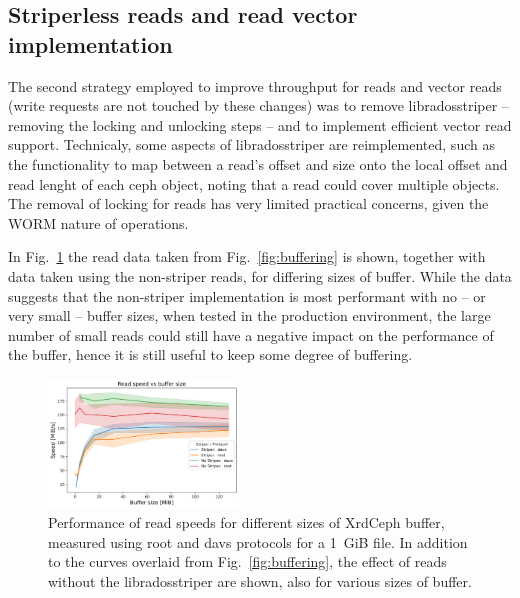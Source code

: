 \documentclass{webofc}
\begin{document}
\subsection{Striperless reads and read vector implementation\label{sec:striperless}}
The second strategy employed to improve throughput for reads and vector reads (write requests are not touched by these changes) was to remove libradosstriper -- removing the locking and unlocking steps -- and to implement efficient vector read support. 
Technicaly, some aspects of libradosstriper are reimplemented, such as the functionality to map between a read's offset and size onto the local offset and read lenght of each ceph object, noting that a read could cover multiple objects. The removal of locking for reads has very limited practical concerns, given the WORM nature of operations.

In Fig.~\ref{fig:bufferingnostriper} the read data taken from Fig.~\ref{fig:buffering} is shown, together with data taken using the non-striper reads, for differing sizes of buffer. While the data suggests that the non-striper implementation is most performant with no -- or very small -- buffer sizes, when tested in the production environment, the large number of small reads could still have a negative impact on the performance of the buffer, hence it is still useful to keep some degree of buffering. 
%
\begin{figure}[h]
     \centering
     \includegraphics[width=0.45\textwidth,clip]{figures/fig_read_speed_comined.png}\hfil
     \caption{Performance of read speeds for different sizes of XrdCeph buffer, measured using root and davs protocols for a 1~GiB file. In addition to the curves overlaid from Fig.~\ref{fig:buffering}, the effect of reads without the libradosstriper are shown, also for various sizes of buffer.}
     \label{fig:bufferingnostriper}       %
\end{figure}
\end{document}
